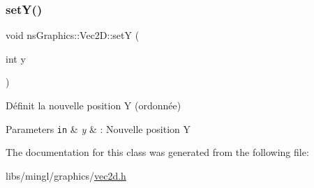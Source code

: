 \subsubsection{\texorpdfstring{set\+Y()}{setY()}}
{\footnotesize\ttfamily void ns\+Graphics\+::\+Vec2\+D\+::setY (\begin{DoxyParamCaption}\item[{int}]{y }\end{DoxyParamCaption})}



Définit la nouvelle position Y (ordonnée) 


\begin{DoxyParams}[1]{Parameters}
\mbox{\tt in}  & {\em y} & \+: Nouvelle position Y \\
\hline
\end{DoxyParams}


The documentation for this class was generated from the following file\+:\begin{DoxyCompactItemize}
\item 
libs/mingl/graphics/\hyperlink{vec2d_8h}{vec2d.\+h}\end{DoxyCompactItemize}
